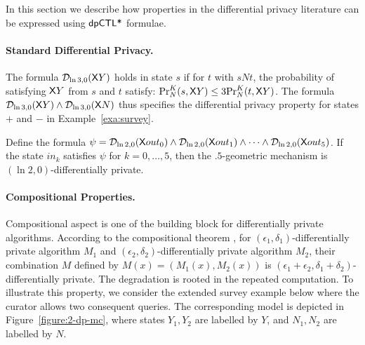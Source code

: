 In this section we describe how properties in the differential privacy literature can be expressed using $\dpCTLstar$ formulae.

\paragraph{Standard Differential Privacy.}
The formula $\dpriv{\ln 3}{0} (\X Y)$ holds in state $s$ if for  $t$ with $sNt$, the probability of satisfying $\X Y$ from $s$ and $t$ satisfy:
$\myPr{s}{K}{N}{\X Y}\le 3\myPr{t}{K}{N}{\X Y}$. The formula $\dpriv{\ln 3}{0} (\X Y)\wedge \dpriv{\ln 3}{0} (\X N)$ thus specifies the differential privacy property for states $+$ and $-$ in Example~\ref{exa:survey}.

 Define the formula
$\psi = \dpriv{\ln 2}{0} (\X out_0) \wedge \dpriv{\ln 2}{0} (\X out_1) \wedge
\cdots \wedge \dpriv{\ln 2}{0} (\X out_5)$. If the state $in_k$ satisfies
$\psi$ for $k = 0, \ldots, 5$, then the $.5$-geometric mechanism is
$(\ln 2, 0)$-differentially private.


\paragraph{Compositional Properties.}
Compositional aspect is one of the building block for differentially private algorithms. According to the compositional theorem \cite[Theorem 3.16]{DR:14:AFDP}, for $(\epsilon_1,\delta_1)$-differentially private algorithm $M_1$ and
$(\epsilon_2,\delta_2)$-differentially private algorithm $M_2$, their combination $M$ defined by $M(x)=(M_1(x), M_2(x))$ is $(\epsilon_1 + \epsilon_2,\delta_1+\delta_2)$-differentially private. The degradation is rooted in the repeated computation. To illustrate this property, we consider the extended survey example below where the curator allows two consequent queries.
The corresponding model is depicted in Figure~\ref{figure:2-dp-mc}, where states $Y_1,Y_2$ are labelled by $Y$, and $N_1,N_2$ are labelled by $N$.

